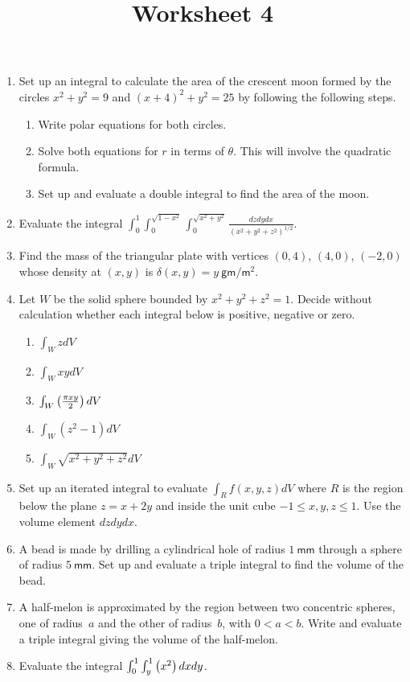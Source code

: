 \documentclass[12pt]{article}
\title{Worksheet 4}
\author{}\date{}
\let\sin\relax\DeclareMathOperator{\sin}{\mathsf{sin}}
\begin{document}
\maketitle
\thispagestyle{empty}

\begin{enumerate}
\item Set up an integral to calculate
the area of the crescent moon formed by
the circles $x^2+y^2=9$ and $\left(x+4\right)^2+y^2=25$
by following the following steps.
\begin{enumerate}
\item Write polar equations for both circles.
\item Solve both equations for $r$ in terms of $\theta$. This
will involve the quadratic formula.
\item Set up and evaluate a double integral to find the area
of the moon.
\end{enumerate}

\item Evaluate the integral
$\int_0^1\int_0^{\sqrt{1-x^2}}\int_0^{\sqrt{x^2+y^2}}
\frac{dzdydx}{\left(x^2+y^2+z^2\right)^{1/2}}$.

\item Find the mass of the triangular plate with vertices
$\left(0,4\right)$, $\left(4,0\right)$, $\left(-2,0\right)$
whose density at $\left(x,y\right)$ is $\delta\left(x,y\right)
=y~\mathsf{gm}/\mathsf{m}^2$.

\item Let $W$ be the solid sphere bounded by $x^2+y^2+z^2=1$.
Decide without calculation whether each integral below
is positive, negative or zero.
\begin{enumerate}
\item $\int_WzdV$
\item $\int_WxydV$
\item $\int_W\sin\left(\frac{\pi xy}{2}\right)dV$
\item $\int_W\left(z^2-1\right)dV$
\item $\int_W\sqrt{x^2+y^2+z^2}dV$
\end{enumerate}

\item Set up an iterated integral to evaluate
$\int_Rf\left(x,y,z\right)dV$ where $R$ is
the region below the plane $z=x+2y$ and inside
the unit cube $-1\le x,y,z\le 1$. Use the volume
element $dzdydx$.

\item A bead is made by drilling a cylindrical
hole of radius $1~\mathsf{mm}$ through a sphere
of radius $5~\mathsf{mm}$. Set up and evaluate
a triple integral to find the volume of the bead.

\item A half-melon is approximated by the region
between two concentric spheres, one of radius~$a$
and the other of radius~$b$, with $0<a<b$. Write
and evaluate a triple integral giving the volume
of the half-melon.

\item Evaluate the integral
$\int_0^1\int_y^1\sin\left(x^2\right)dxdy$.

\end{enumerate}
\end{document}
